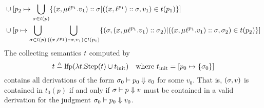\documentclass{article}
\begin{document}
\begin{align*}
	\cup                       & \: [p_2\mapsto\bigcup_{\sigma\in t(p)}\{(x,\mu{\ell}^{p_1}.v_1)::\sigma|((x,{\ell}^{p_1})::\sigma,v_1)\in t(p_1)\}]                                                                                                                                                   \\
	\cup                       & \: [p\mapsto\bigcup_{\sigma\in t(p)}\bigcup_{((x,{\ell}^{p_1})::\sigma,v_1)\in t(p_1)}\{(\sigma,(x,\mu{\ell}^{p_1}.v_1)::\sigma_2)|((x,\mu{\ell}^{p_1}.v_1)::\sigma,\sigma_2)\in t(p_2)\}]
\end{align*}
The collecting semantics $t$ computed by
\[t\triangleq\text{lfp}(\lambda t.\text{Step}(t)\cup t_{\text{init}})\quad\text{where }t_{\text{init}}=[p_0\mapsto\{\sigma_0\}]\]
contains all derivations of the form ${\sigma_0}\vdash{p_0}\Downarrow{v_0}$ for some $v_0$.
That is, $(\sigma,v)$ is contained in $t_0(p)$ if and only if ${\sigma}\vdash{p}\Downarrow{v}$ must be contained in a valid derivation for the judgment ${\sigma_0}\vdash{p_0}\Downarrow{v_0}$.
\end{document}
